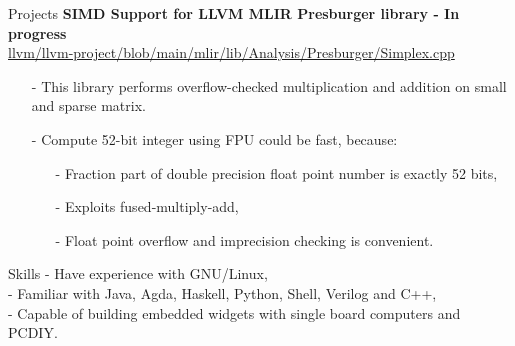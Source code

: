 \documentclass{resume} %
\newcommand{\itemsepval}{-6pt}
\begin{document}
\begin{rSection}{Projects}
    \textbf{SIMD Support for LLVM MLIR Presburger library - In progress} \hfill \\
    \url{llvm/llvm-project/blob/main/mlir/lib/Analysis/Presburger/Simplex.cpp} \hfill \par
    \begin{itemize}
        \itemsep \itemsepval {} 
        \item[-] This library performs overflow-checked multiplication and addition on small and sparse matrix. 
        \item[-] Compute 52-bit integer using FPU could be fast, because: 
        \begin{itemize}
            \itemsep \itemsepval {} 
            \item[-] Fraction part of double precision float point number is exactly 52 bits,
            \item[-] Exploits fused-multiply-add,
            \item[-] Float point overflow and imprecision checking is convenient.
        \end{itemize}
    

    \end{itemize}
\end{rSection} 

\begin{rSection}{Skills}
    - Have experience with GNU/Linux, \\
    - Familiar with Java, Agda, Haskell, Python, Shell, Verilog and C++, \\
    - Capable of building embedded widgets with single board computers and PCDIY.

\end{rSection} 
\end{document}
